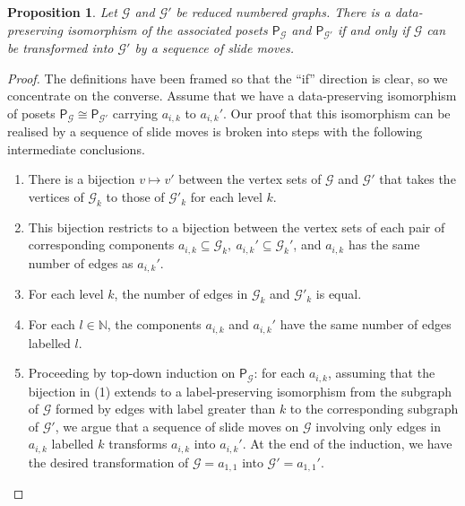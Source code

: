 \documentclass[11pt, a4 paper]{amsart}
\numberwithin{equation}{section}
\newtheorem{proposition}[theorem]{Proposition}
\theoremstyle{remark}
\theoremstyle{definition}
\def\N{\mathbb N}
\begin{document}
\begin{proposition}
\label{iso_posets_sliding_equivalent}
	Let $\mathcal{G}$ and $\mathcal{G}'$ 
	be reduced numbered graphs. 
	There is a data-preserving isomorphism 
	of the associated posets 
	$\mathsf{P}_\mathcal{G}$ and $\mathsf{P}_{\mathcal{G}'}$ 
	if and only if 
	$\mathcal{G}$ can be transformed into $\mathcal{G}'$ 
	by a sequence of slide moves. 
\end{proposition}

\begin{proof} 
	The definitions have been framed 
	so that the ``if'' direction is clear, 
	so we concentrate on the converse. 
	Assume that we have a data-preserving isomorphism of posets 
	$\mathsf{P}_\mathcal{G}\cong\mathsf{P}_{\mathcal{G}'}$ 
	carrying $a_{i, k}$ to $a_{i, k}'$. 
	Our proof that this isomorphism 
	can be realised by a sequence of slide moves 
	is broken into steps 
	with the following intermediate conclusions. 
	\begin{enumerate}
		\item 
		There is a  bijection $v \mapsto v'$ 
		between the vertex sets of $\mathcal{G}$ and ${\mathcal{G}'}$
		that takes the vertices of $\mathcal{G}_k$ to those of $\mathcal{G}'_k$ for each level $k$.
		\item 
		This bijection restricts to a bijection 
		between the vertex sets of each pair of corresponding components 
		$a_{i,k} \subseteq \mathcal{G}_k,\ a_{i,k}'\subseteq \mathcal{G}_k'$,
		and $a_{i,k}$ has the same number of edges as $a_{i,k}'$.
		\item 
		For each level $k$, the number of edges 
		in $\mathcal{G}_k$ and $\mathcal{G}'_k$ is equal.
		\item 
		For each $l\in \N$, the components $a_{i,k}$ and $a_{i,k}'$
		have the same number of edges labelled $l$.
		\item 
		Proceeding by top-down induction on $\mathsf{P}_\mathcal{G}$:   
		for each $a_{i,k}$, assuming that the bijection in (1) 
		extends to a label-preserving isomorphism 
		from the subgraph of $\mathcal{G}$ formed by edges with label greater than $k$
		to the corresponding subgraph of $\mathcal{G}'$, 
		we argue that 
		a sequence of slide moves on $\mathcal{G}$ 
		involving only edges in $a_{i,k}$ labelled $k$
		transforms $a_{i,k}$ into $a_{i,k}'$. 
		At the end of the induction, we have the desired transformation
		of $\mathcal{G}=a_{1,1}$ into $\mathcal{G}'=a_{1,1}'$.
	\end{enumerate}   
	\smallskip
	

\end{proof}
\end{document}
